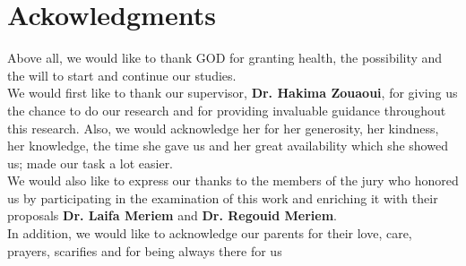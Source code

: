 \chapter*{\hfill Ackowledgments \hfill}

\vspace{3cm}

Above all, we would like to thank GOD for granting health, the possibility and the will to start and continue our studies.\\

We would first like to thank our supervisor,  \textbf{Dr. Hakima Zouaoui}, for giving us the chance to do our research and for providing invaluable guidance throughout this research. Also, we would acknowledge her for her generosity, her kindness, her knowledge, the time she gave us and her great availability which she showed us; made our task a lot easier.\\

We would also like to express our thanks to the members of the jury who honored us by participating in the examination of this work and enriching it with their proposals \textbf{Dr. Laifa Meriem} and \textbf{Dr. Regouid Meriem}.\\

In addition, we would like to acknowledge our parents for their love, care, prayers, scarifies and for being always there for us